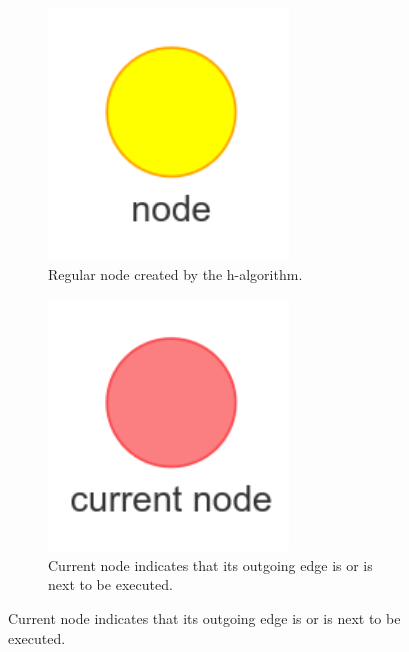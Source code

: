 \begin{figure}[H]
    \centering
    \begin{subfigure}{0.2\textwidth}
    \centering
    \includegraphics[width=0.7\textwidth]{figures/proposed_method/connecting_nodes/legend/node}
    \caption{Regular node created by the \ac{h-algorithm}.\newline}%
    \end{subfigure}
    \begin{subfigure}{0.2\textwidth}
    \centering
    \includegraphics[width=0.7\textwidth]{figures/proposed_method/connecting_nodes/legend/current_node}
    \caption{Current node indicates that its outgoing edge is or is next to be executed.}%
    \end{subfigure}

\end{figure}
